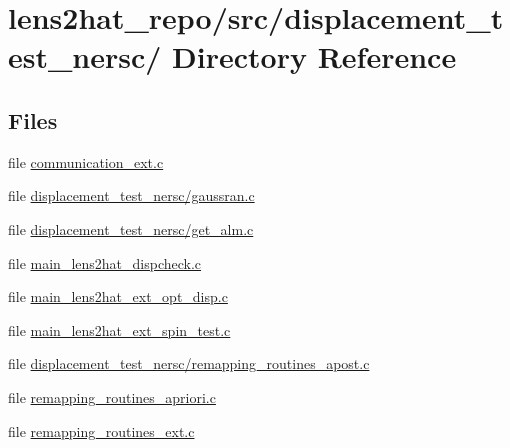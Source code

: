\section{lens2hat\-\_\-repo/src/displacement\-\_\-test\-\_\-nersc/ Directory Reference}
\label{dir_d7d065e17e0da2dff133728a1da14cc0}
\subsection*{Files}
\begin{DoxyCompactItemize}
\item 
file \hyperlink{communication__ext_8c}{communication\-\_\-ext.\-c}
\item 
file \hyperlink{displacement__test__nersc_2gaussran_8c}{displacement\-\_\-test\-\_\-nersc/gaussran.\-c}
\item 
file \hyperlink{displacement__test__nersc_2get__alm_8c}{displacement\-\_\-test\-\_\-nersc/get\-\_\-alm.\-c}
\item 
file \hyperlink{main__lens2hat__dispcheck_8c}{main\-\_\-lens2hat\-\_\-dispcheck.\-c}
\item 
file \hyperlink{main__lens2hat__ext__opt__disp_8c}{main\-\_\-lens2hat\-\_\-ext\-\_\-opt\-\_\-disp.\-c}
\item 
file \hyperlink{main__lens2hat__ext__spin__test_8c}{main\-\_\-lens2hat\-\_\-ext\-\_\-spin\-\_\-test.\-c}
\item 
file \hyperlink{displacement__test__nersc_2remapping__routines__apost_8c}{displacement\-\_\-test\-\_\-nersc/remapping\-\_\-routines\-\_\-apost.\-c}
\item 
file \hyperlink{remapping__routines__apriori_8c}{remapping\-\_\-routines\-\_\-apriori.\-c}
\item 
file \hyperlink{remapping__routines__ext_8c}{remapping\-\_\-routines\-\_\-ext.\-c}
\end{DoxyCompactItemize}
